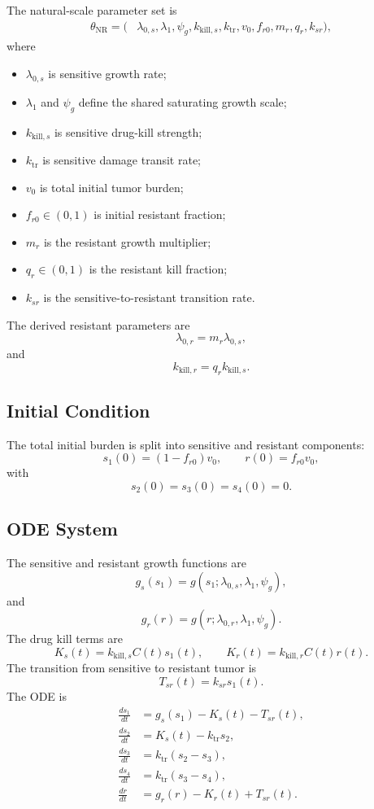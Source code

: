 \documentclass[11pt,a4paper]{article}
\begin{document}
The natural-scale parameter set is
\[
\begin{aligned}
    \theta_{\mathrm{NR}} = (&\lambda_{0,s},\lambda_1,\psi_g,
    k_{\mathrm{kill},s},k_{\mathrm{tr}},v_0,
    f_{r0},m_r,q_r,k_{sr}),
\end{aligned}
\]
where
\begin{itemize}[leftmargin=2em]
    \item $\lambda_{0,s}$ is sensitive growth rate;
    \item $\lambda_1$ and $\psi_g$ define the shared saturating growth scale;
    \item $k_{\mathrm{kill},s}$ is sensitive drug-kill strength;
    \item $k_{\mathrm{tr}}$ is sensitive damage transit rate;
    \item $v_0$ is total initial tumor burden;
    \item $f_{r0}\in(0,1)$ is initial resistant fraction;
    \item $m_r$ is the resistant growth multiplier;
    \item $q_r\in(0,1)$ is the resistant kill fraction;
    \item $k_{sr}$ is the sensitive-to-resistant transition rate.
\end{itemize}
The derived resistant parameters are
\[
    \lambda_{0,r}=m_r\lambda_{0,s},
\]
and
\[
    k_{\mathrm{kill},r}=q_r k_{\mathrm{kill},s}.
\]

\subsection{Initial Condition}

The total initial burden is split into sensitive and resistant components:
\[
    s_1(0)=(1-f_{r0})v_0,
    \qquad
    r(0)=f_{r0}v_0,
\]
with
\[
    s_2(0)=s_3(0)=s_4(0)=0.
\]

\subsection{ODE System}

The sensitive and resistant growth functions are
\[
    g_s(s_1)=g(s_1;\lambda_{0,s},\lambda_1,\psi_g),
\]
and
\[
    g_r(r)=g(r;\lambda_{0,r},\lambda_1,\psi_g).
\]
The drug kill terms are
\[
    K_s(t)=k_{\mathrm{kill},s}C(t)s_1(t),
    \qquad
    K_r(t)=k_{\mathrm{kill},r}C(t)r(t).
\]
The transition from sensitive to resistant tumor is
\[
    T_{sr}(t)=k_{sr}s_1(t).
\]
The ODE is
\[
\begin{aligned}
    \frac{ds_1}{dt}
    &= g_s(s_1) - K_s(t) - T_{sr}(t),\\
    \frac{ds_2}{dt}
    &= K_s(t) - k_{\mathrm{tr}}s_2,\\
    \frac{ds_3}{dt}
    &= k_{\mathrm{tr}}(s_2-s_3),\\
    \frac{ds_4}{dt}
    &= k_{\mathrm{tr}}(s_3-s_4),\\
    \frac{dr}{dt}
    &= g_r(r) - K_r(t) + T_{sr}(t).
\end{aligned}
\]
\end{document}
